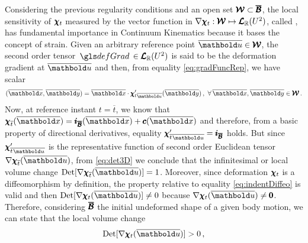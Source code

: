 Considering the previous regularity conditions and an open set $\pmb{\mathcal{W}}\subset\pmb{\overline{\mathcal{B}}}$, the local sensitivity of $\pmb{\chi}_t$ measured by the vector function in $\nabla\pmb{\chi}_t : \pmb{\mathcal{W}} \mapsto \pmb{\mathcal{L}}_{\mathbb{R}}(U^{2})$, called , has fundamental importance in Continuum Kinematics because it bases the concept of strain. Given an arbitrary reference point $\overline{\vto{u}}\in\pmb{\mathcal{W}}$, the second order tensor $\gloref{defGrad}\in\ete{\real}{U^2}$ is said to be the deformation gradient at $\overline{\vto{u}}$ and then, from equality \eqref{eq:gradFuncRep}, we have scalar
\begin{equation}
[\fua{\nabla\tnr{\chi}_t}{\overline{\vto{u}}}](\overline{\vto{x}},\overline{\vto{y}})=\overline{\vto{x}}\cdot\fua{{\tnr{\chi}'_t}_{\overline{\vto{u}}}}{\overline{\vto{y}}}\,,\,\,\forall\, \overline{\vto{x}},\overline{\vto{y}}\in\pmb{\mathcal{W}}\,.
\end{equation}
Now, at reference instant $t=\overline{t}$, we know that $\tnr{\chi}_{\overline{t}}(\overline{\vto{x}})=\tnr{i}_{\tnr{\overline{\mathcal{B}}}}(\overline{\vto{x}})+\fua{\vtf{c}}{\overline{\vto{x}}}$ and therefore, from a basic property of directional derivatives, equality ${\tnr{\chi}'_{\overline{t}} }_{\overline{\vto{u}}}=\tnr{i}_{\tnr{\overline{\mathcal{B}}}}$ holds. But since ${\tnr{\chi}'_{\overline{t}} }_{\overline{\vto{u}}}$ is the representative function of second order Euclidean tensor $\fua{\nabla\tnr{\chi}_{\overline{t}}}{\overline{\vto{u}}}$, from \eqref{eq:det3D} we conclude that the infinitesimal or local volume change $\textnormal{Det}[\fua{\nabla\tnr{\chi}_{\overline{t}}}{\overline{\vto{u}}}]=1$. Moreover, since deformation $\pmb{\chi}_{t}$ is a diffeomorphism by definition, the property relative to equality \eqref{eq:indentDiffeo} is valid and then $\textnormal{Det}[\fua{\nabla\tnr{\chi}_{t}}{\overline{\vto{u}}}]\neq 0$ because $\fua{\nabla\tnr{\chi}_{t}}{\overline{\vto{u}}}\neq \tnr{0}$. Therefore, considering $\pmb{\overline{\mathcal{B}}}$ the initial undeformed shape of a given body motion, we can state that the local volume change       
\begin{equation}\label{eq:detPositive}
\textnormal{Det}[\fua{\nabla\tnr{\chi}_t}{\overline{\vto{u}}}]>0\,,
\end{equation}
